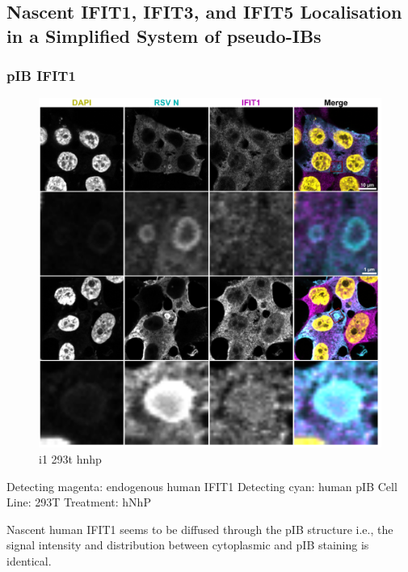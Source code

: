\subsection{Nascent IFIT1, IFIT3, and IFIT5 Localisation in a Simplified System of pseudo-IBs} \label{subsec:Nascent IFIT1, IFIT3, and IFIT5 Localisation in a Simplified System of pseudo-IBs}
\subsubsection{pIB IFIT1}

\begin{figure}
    \centering
    \includegraphics[width=1\linewidth]{09. Chapter 4/Figs/03. pIB/01. i1 endo_human.pdf}
    \caption[i1 293t hnhp]{i1 293t hnhp}
    \label{fig:i1 293t hnhp}
\end{figure}

Detecting magenta: endogenous human IFIT1 \newline
Detecting cyan: human pIB \newline
Cell Line: 293T \newline
Treatment: hNhP \newline

Nascent human IFIT1 seems to be diffused through the pIB structure i.e., the signal intensity and distribution between cytoplasmic and pIB staining is identical.  

